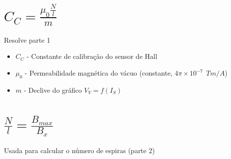 \documentclass{report}
\begin{document}
\section*{$C_C = \frac{\mu_0 \frac{N}{l}}{m}$}
Resolve parte 1
\begin{itemize}
    \item $C_C$ - Constante de calibração do sensor de Hall
    \item $\mu_0$ - Permeabilidade magnética do vácuo (constante, $4\pi \times 10^{-7}~~Tm/A$)
    \item $m$ - Declive do gráfico $V_V = f(I_S)$
\end{itemize}

\section*{$\frac{N}{l} = \frac{B_{max}}{B_x}$}
Usada para calcular o número de espiras (parte 2)

%


\end{document}
